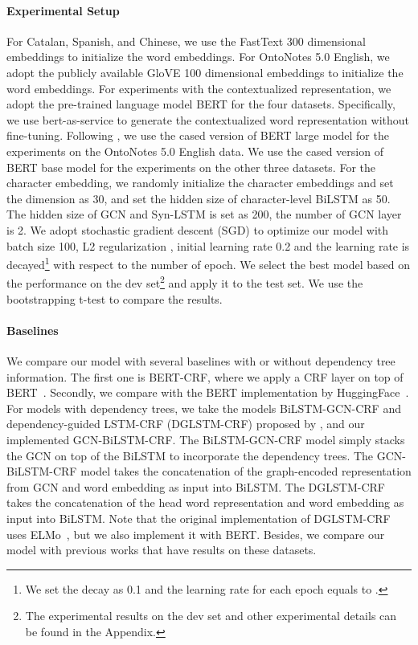 \documentclass[11pt]{article}
\begin{document}
\paragraph{Experimental Setup}
For Catalan, Spanish, and Chinese,  we use the FastText \cite{grave2018learning} 300 dimensional embeddings to initialize the word embeddings. 
For OntoNotes 5.0 English, we adopt the publicly available GloVE \cite{pennington2014glove} 100 dimensional embeddings to initialize the word embeddings.  
For experiments with the contextualized representation, we adopt the pre-trained language model BERT \cite{devlin2019bert} for the four datasets.  
Specifically, we use bert-as-service \cite{xiao2018bertservice} to generate the contextualized word representation without fine-tuning. 
Following \citet{Luo2019HierarchicalCR}, we use the cased version of BERT large model for the experiments on the OntoNotes 5.0 English data. 
We use the cased version of BERT base model for the experiments on the other three datasets.
For the character embedding, we randomly initialize the character embeddings and set the dimension as 30, and set the hidden size of character-level BiLSTM as 50. 
The hidden size of GCN and Syn-LSTM is set as 200, the number of GCN layer is 2. 
We adopt stochastic gradient descent (SGD) to optimize our model with batch size 100, L2 regularization , {\color{black}initial} learning rate  0.2 and the learning rate is decayed\footnote{We set the decay as 0.1 and the learning rate for each epoch equals to .} with respect to the number of epoch. 
We select the best model based on the performance on the dev set\footnote{The experimental results on the dev set and other experimental details can be found in the Appendix.} and apply it to the test set. 
We use the bootstrapping t-test to compare the results.







\paragraph{Baselines} 
We compare our model with several baselines with or without dependency tree information. 
The first one is BERT-CRF, where we apply a CRF layer on top of BERT~\cite{devlin2019bert}. 
Secondly, we compare with the BERT implementation by HuggingFace~\cite{Wolf2019HuggingFacesTS}. 
For models with dependency trees, we take the {\color{black}models} BiLSTM-GCN-CRF and dependency-guided LSTM-CRF (DGLSTM-CRF) proposed by \citet{Jie2019DependencyGuidedLF}, and our implemented GCN-BiLSTM-CRF. 
The BiLSTM-GCN-CRF {\color{black}model} simply stacks the GCN on top of the BiLSTM to incorporate the dependency trees. 
The GCN-BiLSTM-CRF {\color{black}model} takes the concatenation of the graph-encoded representation from GCN and word embedding as input into BiLSTM.
{\color{black}The DGLSTM-CRF takes the concatenation of the head word representation and word embedding as input into BiLSTM.
Note that the original implementation of DGLSTM-CRF uses ELMo~\cite{peters2018deep}, {\color{black}but} we also implement it with BERT. 
Besides, we compare our model with previous works that have results on these datasets. }
\end{document}
